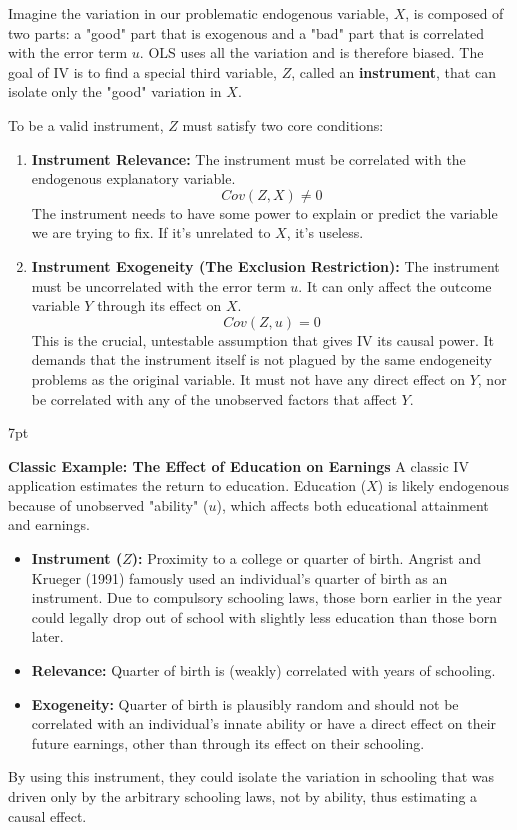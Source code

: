 \documentclass{article}
\newenvironment{redblock}{
\def\FrameCommand{
  \hspace{1pt}
    {\color{LightCoral}
    \vrule width 2pt}
    {\color{redshade}
    \vrule width 4pt}
  \colorbox{redshade}
}
\MakeFramed{
  \advance
  \hsize-
  \width
  \FrameRestore}
\noindent\hspace{-4.55pt}%
\begin{adjustwidth}{}{7pt}
\vspace{2pt}\vspace{2pt}
}
{\vspace{2pt}\end{adjustwidth}\endMakeFramed}
\begin{document}
Imagine the variation in our problematic endogenous variable, $X$, is composed of two parts: a "good" part that is exogenous and a "bad" part that is correlated with the error term $u$. OLS uses all the variation and is therefore biased. The goal of IV is to find a special third variable, $Z$, called an \textbf{instrument}, that can isolate only the "good" variation in $X$.

To be a valid instrument, $Z$ must satisfy two core conditions:

\begin{enumerate}
    \item \textbf{Instrument Relevance:} The instrument must be correlated with the endogenous explanatory variable.
    \begin{equation}
        Cov(Z, X) \neq 0
    \end{equation}
    The instrument needs to have some power to explain or predict the variable we are trying to fix. If it's unrelated to $X$, it's useless.
    
    \item \textbf{Instrument Exogeneity (The Exclusion Restriction):} The instrument must be uncorrelated with the error term $u$. It can only affect the outcome variable $Y$ through its effect on $X$.
    \begin{equation}
        Cov(Z, u) = 0
    \end{equation}
    This is the crucial, untestable assumption that gives IV its causal power. It demands that the instrument itself is not plagued by the same endogeneity problems as the original variable. It must not have any direct effect on $Y$, nor be correlated with any of the unobserved factors that affect $Y$.
\end{enumerate}

\begin{redblock}
\textbf{Classic Example: The Effect of Education on Earnings}
A classic IV application estimates the return to education. Education ($X$) is likely endogenous because of unobserved "ability" ($u$), which affects both educational attainment and earnings.
\begin{itemize}
    \item \textbf{Instrument ($Z$):} Proximity to a college or quarter of birth. Angrist and Krueger (1991) famously used an individual's quarter of birth as an instrument. Due to compulsory schooling laws, those born earlier in the year could legally drop out of school with slightly less education than those born later.
    \item \textbf{Relevance:} Quarter of birth is (weakly) correlated with years of schooling.
    \item \textbf{Exogeneity:} Quarter of birth is plausibly random and should not be correlated with an individual's innate ability or have a direct effect on their future earnings, other than through its effect on their schooling.
\end{itemize}
By using this instrument, they could isolate the variation in schooling that was driven only by the arbitrary schooling laws, not by ability, thus estimating a causal effect.
\end{redblock}
\end{document}
